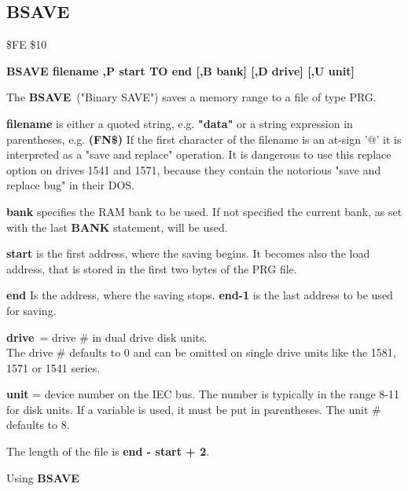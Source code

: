 \subsection{BSAVE}
\begin{description}[leftmargin=3cm,style=nextline]
\item [Token:] \$FE \$10
\item [Format:] {\bf BSAVE filename ,P start TO end
                [,B bank] [,D drive] [,U unit] }
\item [Usage:]
   The {\bf BSAVE} ("Binary SAVE") saves a memory range to
   a file of type PRG.

   {\bf filename} is either a quoted string, e.g. {\bf "data"} or
   a string expression in parentheses, e.g. {\bf (FN\$)}
   If the first character of the filename is an at-sign '@' it
   is interpreted as a "save and replace" operation. It is dangerous
   to use this replace option on drives 1541 and 1571, because they
   contain the notorious "save and replace bug" in their DOS.

   {\bf bank} specifies the RAM bank to be used.
   If not specified the current bank, as set with the last
   {\bf BANK} statement, will be used.

   {\bf start} is the first address, where the saving begins.
   It becomes also the load address,
   that is stored in the first two bytes of the PRG file.

   {\bf end} Is the address, where the saving stops.
   {\bf end-1} is the last address to be used for saving.

   {\bf drive} = drive \# in dual drive disk units. \\
   The drive \# defaults to 0 and can be omitted on single drive units
   like the 1581, 1571 or 1541 series.

   {\bf unit} = device number on the IEC bus.
   The number is typically in the range 8-11 for disk units.
   If a variable is used, it must be put in parentheses.
   The unit \# defaults to 8.

\item [Remarks:]
   The length of the file is {\bf end - start + 2}.

\item [Example:] Using {\bf BSAVE}
\end{description}

